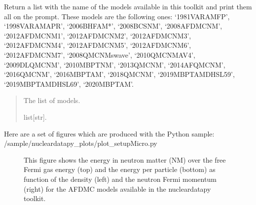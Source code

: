 \documentclass[letterpaper,10pt,english]{sphinxmanual}
\begin{document}
\begin{fulllineitems}
\label{\detokenize{source/api/setup_micro:nucleardatapy.setup_micro.models_micro}}
\pysigstartsignatures
{}
\pysigstopsignatures
\sphinxAtStartPar
Return a list with the name of the models available in this toolkit and     print them all on the prompt. These models are the following ones:     ‘1981\sphinxhyphen{}VAR\sphinxhyphen{}AM\sphinxhyphen{}FP’, ‘1998\sphinxhyphen{}VAR\sphinxhyphen{}AM\sphinxhyphen{}APR’, ‘2006\sphinxhyphen{}BHF\sphinxhyphen{}AM*’, ‘2008\sphinxhyphen{}BCS\sphinxhyphen{}NM’, ‘2008\sphinxhyphen{}AFDMC\sphinxhyphen{}NM’,     ‘2012\sphinxhyphen{}AFDMC\sphinxhyphen{}NM\sphinxhyphen{}1’, ‘2012\sphinxhyphen{}AFDMC\sphinxhyphen{}NM\sphinxhyphen{}2’, ‘2012\sphinxhyphen{}AFDMC\sphinxhyphen{}NM\sphinxhyphen{}3’, ‘2012\sphinxhyphen{}AFDMC\sphinxhyphen{}NM\sphinxhyphen{}4’,     ‘2012\sphinxhyphen{}AFDMC\sphinxhyphen{}NM\sphinxhyphen{}5’, ‘2012\sphinxhyphen{}AFDMC\sphinxhyphen{}NM\sphinxhyphen{}6’, ‘2012\sphinxhyphen{}AFDMC\sphinxhyphen{}NM\sphinxhyphen{}7’,     ‘2008\sphinxhyphen{}QMC\sphinxhyphen{}NM\sphinxhyphen{}swave’, ‘2010\sphinxhyphen{}QMC\sphinxhyphen{}NM\sphinxhyphen{}AV4’, ‘2009\sphinxhyphen{}DLQMC\sphinxhyphen{}NM’, ‘2010\sphinxhyphen{}MBPT\sphinxhyphen{}NM’,     ‘2013\sphinxhyphen{}QMC\sphinxhyphen{}NM’, ‘2014\sphinxhyphen{}AFQMC\sphinxhyphen{}NM’, ‘2016\sphinxhyphen{}QMC\sphinxhyphen{}NM’, ‘2016\sphinxhyphen{}MBPT\sphinxhyphen{}AM’,     ‘2018\sphinxhyphen{}QMC\sphinxhyphen{}NM’, ‘2019\sphinxhyphen{}MBPT\sphinxhyphen{}AM\sphinxhyphen{}DHSL59’, ‘2019\sphinxhyphen{}MBPT\sphinxhyphen{}AM\sphinxhyphen{}DHSL69’,     ‘2020\sphinxhyphen{}MBPT\sphinxhyphen{}AM’.
\begin{quote}\begin{description}
\sphinxAtStartPar
The list of models.

\sphinxAtStartPar
list{[}str{]}.

\end{description}\end{quote}

\end{fulllineitems}


\sphinxAtStartPar
Here are a set of figures which are produced with the Python sample: /sample/nucleardatapy\_plots/plot\_setupMicro.py

\begin{figure}[htbp]
\centering
\capstart

\noindent{}
\caption{This figure shows the energy in neutron matter (NM) over the free Fermi gas energy (top) and the energy per particle (bottom) as function of the density (left) and the neutron Fermi momentum (right) for the AFDMC models available in the nucleardatapy toolkit.}\label{\detokenize{source/api/setup_micro:id1}}\end{figure}
\end{document}
